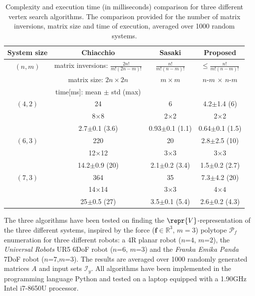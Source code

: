 \begin{table}[!h]
    \centering
    \caption{Complexity and execution time (in milliseconds) comparison for three different vertex search algorithms. The comparison provided for the number of matrix inversions, matrix size and time of execution, averaged over 1000 random systems. }
    \begin{tabular}{|c|c|c|c|}
       \hline
      \textbf{ System size }& \textbf{Chiacchio}\cite{chiacchio_evaluation_1996} & \textbf{Sasaki} \cite{sasaki_vertex_nodate}  &  \textbf{Proposed} \\
       \hline
       $(n,m)$& matrix inversions: $ \frac{2n!}{m!(2n-m)!}$  & $ \frac{n!}{m!(n-m)!} $ & $ \leq \frac{n!}{m!(n-m)!}$ \\
       &  matrix size:  $ 2n \times 2n$ & $m\times m$  & $n$-$m$ $\times$ $n$-$m$\\
       & time[ms]: mean $\pm$ std (max) & & \\
       \hline
       $(4,2)$ &  24 & 6 & 4.2$\pm$1.4 (6) \\ 
       & 8$\times$8 & 2$\times$2 & 2$\times$2 \\ 
       & 2.7$\pm$0.1 (3.6) & 0.93$\pm$0.1 (1.1) & 0.64$\pm$0.1 (1.5) \\ 
       \hline
       $(6,3)$ & 220 & 20 & 2.8$\pm$2.5 (10) \\ 
        & 12$\times$12 & 3$\times$3 & 3$\times$3 \\ 
       & 14.2$\pm$0.9 (20) & 2.1$\pm$0.2 (3.4) & 1.5$\pm$0.2 (2.7) \\ 
       \hline
      $(7,3)$&    364 & 35 & 7.3$\pm$4.2 (20)\\
        & 14$\times$14 & 3$\times$3 & 4$\times4$\\
       & 25$\pm$0.5 (27) & 3.5$\pm$0.1 (5.4) & 2.6$\pm$0.2 (4.3)\\

       \hline
    \end{tabular}
    \label{tab:complexity_results}
\end{table}


The three algorithms have been tested on finding the $\repr{V}$-representation of the three different systems, inspired by the force ($\bm{f}\in\mathbb{R}^3$, $m=3$) polytope $\mathcal{P}_f$ enumeration for three different robots: a 4R planar robot ($n$=$4$, $m$=$2$), the \textit{Universal Robots} UR5 6DoF robot ($n$=$6$, $m$=$3$) and the \textit{Franka Emika Panda} 7DoF robot ($n$=$7$,$m$=$3$). The results are averaged over 1000 randomly generated matrices $A$ and input sets $\mathcal{I}_y$. All algorithms have been implemented in the programming language Python and tested on a laptop equipped with a 1.90GHz Intel i7-8650U processor. 


